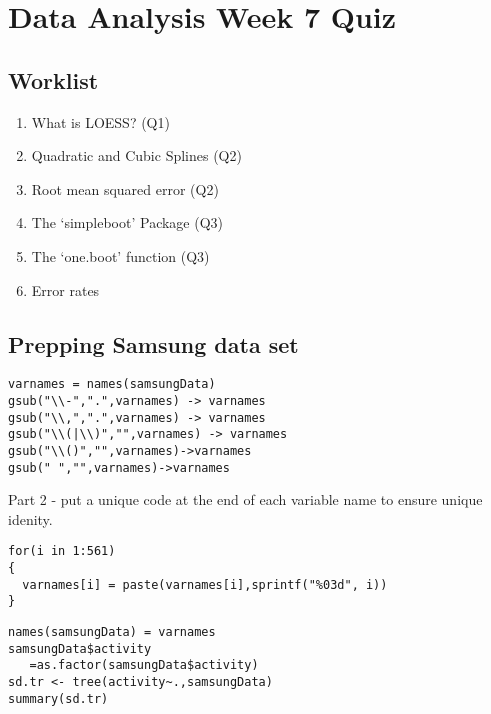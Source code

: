 \documentclass[12pt]{article}
\begin{document}
\section{Data Analysis Week 7 Quiz}


\subsection*{Worklist}
\begin{enumerate}
\item What is LOESS? (Q1)
\item Quadratic and Cubic Splines (Q2)
\item Root mean squared error (Q2)
\item The `simpleboot' Package (Q3)
\item The `one.boot' function (Q3)
\item Error rates
\end{enumerate}
\newpage
\subsection*{Prepping Samsung data set}
\begin{framed}
\begin{verbatim}
varnames = names(samsungData) 
gsub("\\-",".",varnames) -> varnames
gsub("\\,",".",varnames) -> varnames
gsub("\\(|\\)","",varnames) -> varnames
gsub("\\()","",varnames)->varnames
gsub(" ","",varnames)->varnames 

\end{verbatim}
\end{framed}
Part 2 - put a unique code at the end of each variable name to ensure unique idenity.
\begin{framed}
\begin{verbatim}
for(i in 1:561)
{ 
  varnames[i] = paste(varnames[i],sprintf("%03d", i))
}

\end{verbatim}
\end{framed}


\begin{framed}
\begin{verbatim}
names(samsungData) = varnames
samsungData$activity 
   =as.factor(samsungData$activity)
sd.tr <- tree(activity~.,samsungData)
summary(sd.tr)

\end{verbatim}
\end{framed}
\end{document}
